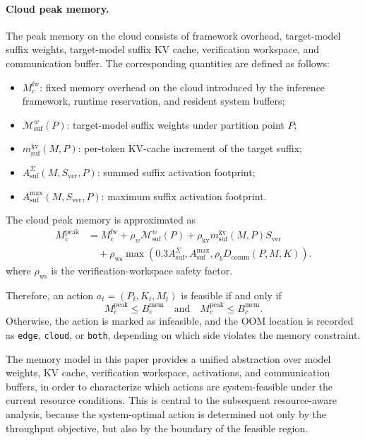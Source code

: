 \documentclass[a4paper,fleqn]{cas-dc}
\begin{document}
\paragraph{Cloud peak memory.}
The peak memory on the cloud consists of framework overhead, target-model suffix weights, target-model suffix KV cache, verification workspace, and communication buffer. The corresponding quantities are defined as follows:
\begin{itemize}
    \item $M_c^{\mathrm{fw}}$: fixed memory overhead on the cloud introduced by the inference framework, runtime reservation, and resident system buffers;
    \item $\mathcal{M}_{\mathrm{suf}}^w(P)$: target-model suffix weights under partition point $P$;
    \item $m_{\mathrm{suf}}^{\mathrm{kv}}(M,P)$: per-token KV-cache increment of the target suffix;
    \item $A_{\mathrm{suf}}^\Sigma(M,S_{\mathrm{ver}},P)$: summed suffix activation footprint;
    \item $A_{\mathrm{suf}}^{\max}(M,S_{\mathrm{ver}},P)$: maximum suffix activation footprint.
\end{itemize}

The cloud peak memory is approximated as
\begin{equation}
\begin{aligned}
M_c^{\mathrm{peak}} &= M_c^{\mathrm{fw}} + \rho_w \mathcal{M}_{\mathrm{suf}}^w(P) + \rho_{\mathrm{kv}} m_{\mathrm{suf}}^{\mathrm{kv}}(M,P)S_{\mathrm{ver}} \\
&\quad + \rho_{\mathrm{ws}} \max\left(0.3A_{\mathrm{suf}}^\Sigma, A_{\mathrm{suf}}^{\max}, \rho_b D_{\mathrm{comm}}(P,M,K)\right).
\end{aligned}
\end{equation}
where $\rho_{\mathrm{ws}}$ is the verification-workspace safety factor.

Therefore, an action $a_t=(P_t,K_t,M_t)$ is feasible if and only if
\begin{equation}
M_e^{\mathrm{peak}} \leq B_e^{\mathrm{mem}}
\quad \text{and} \quad
M_c^{\mathrm{peak}} \leq B_c^{\mathrm{mem}}.
\end{equation}
Otherwise, the action is marked as infeasible, and the OOM location is recorded as \texttt{edge}, \texttt{cloud}, or \texttt{both}, depending on which side violates the memory constraint.

The memory model in this paper provides a unified abstraction over model weights, KV cache, verification workspace, activations, and communication buffers, in order to characterize which actions are system-feasible under the current resource conditions. This is central to the subsequent resource-aware analysis, because the system-optimal action is determined not only by the throughput objective, but also by the boundary of the feasible region.
\end{document}
